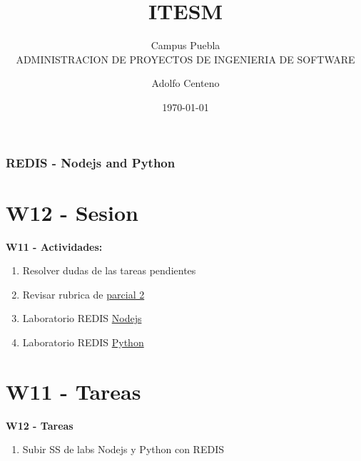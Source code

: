 \documentclass{beamer}
\begin{document}
\title{ITESM}  
\subtitle{Campus Puebla\\ADMINISTRACION DE PROYECTOS DE INGENIERIA DE SOFTWARE
}
\author{Adolfo Centeno}
\date{\today} 


\begin{frame}
\titlepage
\end{frame}

\begin{frame}\frametitle{REDIS - Nodejs and Python}
\tableofcontents
\end{frame} 


\section{W12 - Sesion }

\begin{frame}

    
\textbf{W11 - Actividades:}


\begin{enumerate}

\item
    Resolver dudas de las tareas pendientes 
\item
	Revisar rubrica de  \href{https://redis.io/topics/quickstart}{parcial 2}

\item
   Laboratorio REDIS    
    \href{https://redis.io/topics/quickstart}{Nodejs}

\item
   Laboratorio REDIS    
    \href{https://redis.io/topics/quickstart}{Python}
	 
\end{enumerate}

	


\end{frame}


\section{W11  - Tareas }

\begin{frame}


\textbf{W12  - Tareas}


\begin{enumerate}

\item
  Subir SS de labs Nodejs y Python con REDIS
  	
\end{enumerate} 


\end{frame}
\end{document}
